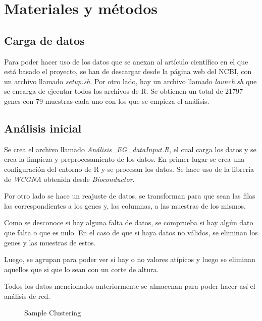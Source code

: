 \section{Materiales y métodos}
\subsection{Carga de datos}
Para poder hacer uso de los datos que se anexan al artículo científico en el que está basado el proyecto, se han de descargar desde la página web del NCBI, con un archivo llamado \textit{setup.sh}. Por otro lado, hay un archivo llamado \textit{launch.sh} que se encarga de ejecutar todos los archivos de R. Se obtienen un total de 21797 genes con 79 muestras cada uno con los que se empieza el análisis.

\subsection{Análisis inicial}
Se crea el archivo llamado \textit{Análisis\_EG\_dataInput.R}, el cual carga los datos y se crea la limpieza y preprocesamiento de los datos. En primer lugar se crea una configuración del entorno de R y se procesan los datos. Se hace uso de la librería de \textit{WCGNA} obtenida desde \textit{Bioconductor}. 

Por otro lado se hace un reajuste de datos, se transforman para que sean las filas las correspondientes a los genes y, las columnas, a las muestras de los mismos.

Como se desconoce si hay alguna falta de datos, se comprueba si hay algún dato que falta o que es nulo. En el caso de que si haya datos no válidos, se eliminan los genes y las muestras de estos.

Luego, se agrupan para poder ver si hay o no valores atípicos y luego se eliminan aquellos que si que lo sean con un corte de altura. 

Todos los datos mencionados anteriormente se almacenan para poder hacer así el análisis de red.

\begin{figure}[!]
	\caption{Sample Clustering}
	\label{fig:sample_clustering}
\end{figure}

